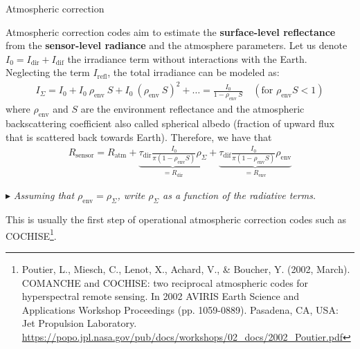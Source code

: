 \documentclass[aspectratio=169, 9pt]{beamer}
\begin{document}
\begin{frame}{Atmospheric correction}

Atmospheric correction codes aim to estimate the \textbf{surface-level reflectance} from the \textbf{sensor-level radiance} and the atmosphere parameters. Let us denote $I_0 = I_{\text{dir}} + I_{\text{dif}}$ the irradiance term without interactions with the Earth. Neglecting the term $I_{\text{refl}}$, the total irradiance can be modeled as:
\begin{align*}
	I_{\Sigma} = I_0 + I_0 \: \rho_{\text{env}} \: S + I_0 \: (\rho_{\text{env}} \: S)^2 + \ldots = \frac{I_0}{1 - \rho_{\text{env}} \: S} \quad (\text{for } \rho_{\text{env}} S < 1) 
\end{align*}
where $\rho_{\text{env}}$ and $S$ are the environment reflectance and the atmospheric backscattering coefficient also called spherical albedo (fraction of upward flux that is scattered back towards Earth). Therefore, we have that
\begin{align*}
	R_{\text{sensor}} = R_{\text{atm}} + \underbrace{\tau_{\text{dir}} \frac{I_0}{\pi (1 - \rho_{\text{env}} S)} \rho_{\Sigma}}_{=R_{\text{dir}}} + \underbrace{\tau_{\text{dif}} \frac{I_0}{\pi (1 - \rho_{\text{env}} S)} \rho_{\text{env}}}_{=R_{\text{env}}}
\end{align*}


$\blacktriangleright$ \textit{Assuming that $\rho_{\text{env}} = \rho_{\Sigma}$, write $\rho_{\Sigma}$ as a function of the radiative terms.} \vspace{0.2cm}

This is usually the first step of operational atmospheric correction codes such as COCHISE\footnote{Poutier, L., Miesch, C., Lenot, X., Achard, V., \& Boucher, Y. (2002, March). COMANCHE and COCHISE: two reciprocal atmospheric codes for hyperspectral remote sensing. In 2002 AVIRIS Earth Science and Applications Workshop Proceedings (pp. 1059-0889). Pasadena, CA, USA: Jet Propulsion Laboratory. \url{https://popo.jpl.nasa.gov/pub/docs/workshops/02_docs/2002_Poutier.pdf}}.


\end{frame}
\end{document}

